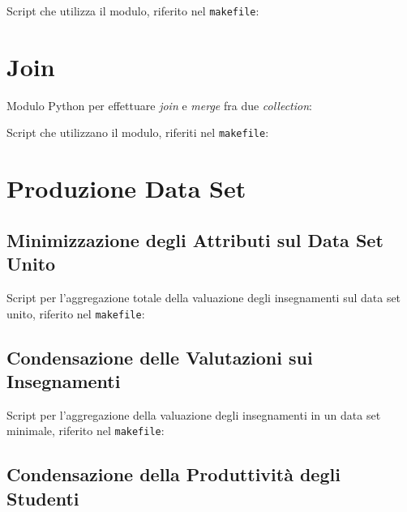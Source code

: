 \begin{appendices}
        \vspace{0.6 cm}

        Script che utilizza il modulo, riferito nel \texttt{makefile}:
        

    \section{Join}
    \label{appendix:merge}
        Modulo Python per effettuare \textit{join} e \textit{merge} fra due \textit{collection}:
        

        \vspace{0.6 cm}

        Script che utilizzano il modulo, riferiti nel \texttt{makefile}:
        
        

    \section{Produzione Data Set}

        \subsection{Minimizzazione degli Attributi sul Data Set Unito}
        \label{appendix:min}

            Script per l'aggregazione totale della valuazione degli insegnamenti sul data set unito, riferito nel \texttt{makefile}:
            

        \subsection{Condensazione delle Valutazioni sui Insegnamenti}
        \label{appendix:eval}

            Script per l'aggregazione della valuazione degli insegnamenti in un data set minimale, riferito nel \texttt{makefile}:
            

        \subsection{Condensazione della Produttività degli Studenti}
        \label{appendix:stud}


\end{appendices}
